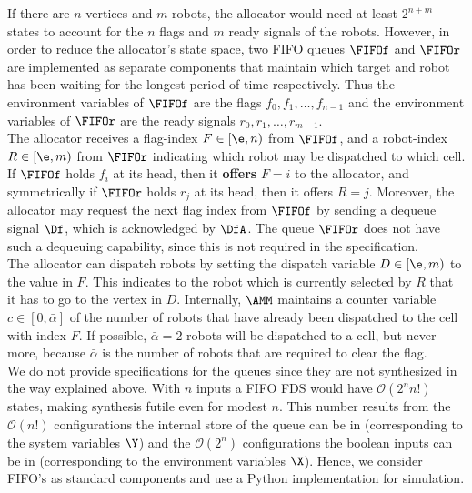 If there are $n$ vertices and $m$ robots, the allocator would need at least $2^{n+m}$ states to account for the $n$ flags and $m$ ready signals of the robots. However, in order to reduce the allocator's state space, two FIFO queues $\FIFOf$ and $\FIFOr$ are implemented as separate components that maintain which target and robot has been waiting for the longest period of time respectively. Thus the environment variables of $\FIFOf$ are the flags $f_0, f_1, \ldots, f_{n-1}$ and the environment variables of $\FIFOr$ are the ready signals $r_0, r_1, \ldots, r_{m-1}$.\\

The allocator receives a flag-index $F \in [\e, n)$ from $\FIFOf$, and a robot-index $R \in [\e, m)$ from $\FIFOr$ indicating which robot may be dispatched to which cell. If $\FIFOf$ holds $f_i$ at its head, then it {\bf offers} $F = i$ to the allocator, and symmetrically if $\FIFOr$ holds $r_j$ at its head, then it offers $R = j$. Moreover, the allocator may request the next flag index from $\FIFOf$ by sending a dequeue signal $\Df$, which is acknowledged by $\DfA$. The queue $\FIFOr$ does not have such a dequeuing capability, since this is not required in the specification.\\

The allocator can dispatch robots by setting the dispatch variable $D \in [\e, m)$ to the value in $F$. This indicates to the robot which is currently selected by $R$ that it has to go to the vertex in $D$. Internally, $\AMM$ maintains a counter variable $c \in [0,\bar{\alpha}]$ of the number of robots that have already been dispatched to the cell with index $F$. If possible, $\bar{\alpha} = 2$ robots will be dispatched to a cell, but never more, because $\bar{\alpha}$ is the number of robots that are required to clear the flag.\\

We do not provide specifications for the queues since they are not synthesized in the way explained above. With $n$ inputs a FIFO FDS would have $\mathcal{O}(2^nn!)$ states, making synthesis futile even for modest $n$. This number results from the $\mathcal{O}(n!)$ configurations the internal store of the queue can be in (corresponding to the system variables $\Y$) and the $\mathcal{O}(2^n)$ configurations the boolean inputs can be in (corresponding to the environment variables $\X$). Hence, we consider FIFO's as standard components and use a Python implementation for simulation.\\


